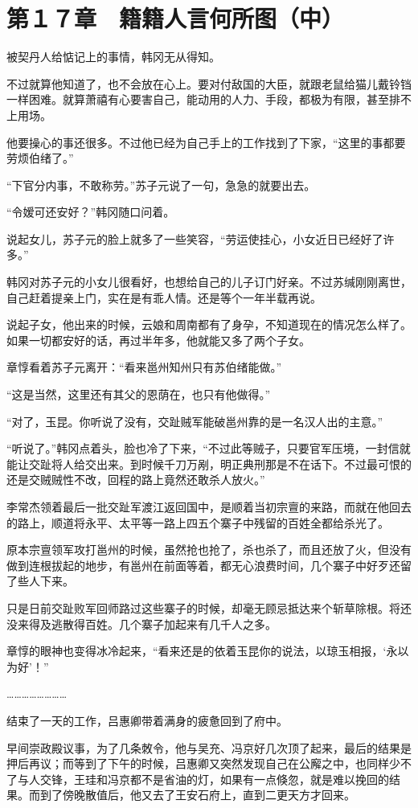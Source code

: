 \section{第１７章　籍籍人言何所图（中）}

被契丹人给惦记上的事情，韩冈无从得知。

不过就算他知道了，也不会放在心上。要对付敌国的大臣，就跟老鼠给猫儿戴铃铛一样困难。就算萧禧有心要害自己，能动用的人力、手段，都极为有限，甚至排不上用场。

他要操心的事还很多。不过他已经为自己手上的工作找到了下家，“这里的事都要劳烦伯绪了。”

“下官分内事，不敢称劳。”苏子元说了一句，急急的就要出去。

“令嫒可还安好？”韩冈随口问着。

说起女儿，苏子元的脸上就多了一些笑容，“劳运使挂心，小女近日已经好了许多。”

韩冈对苏子元的小女儿很看好，也想给自己的儿子订门好亲。不过苏缄刚刚离世，自己赶着提亲上门，实在是有乖人情。还是等个一年半载再说。

说起子女，他出来的时候，云娘和周南都有了身孕，不知道现在的情况怎么样了。如果一切都安好的话，再过半年多，他就能又多了两个子女。

章惇看着苏子元离开：“看来邕州知州只有苏伯绪能做。”

“这是当然，这里还有其父的恩荫在，也只有他做得。”

“对了，玉昆。你听说了没有，交趾贼军能破邕州靠的是一名汉人出的主意。”

“听说了。”韩冈点着头，脸也冷了下来，“不过此等贼子，只要官军压境，一封信就能让交趾将人给交出来。到时候千刀万剐，明正典刑那是不在话下。不过最可恨的还是交贼贼性不改，回程的路上竟然还敢杀人放火。”

李常杰领着最后一批交趾军渡江返回国中，是顺着当初宗亶的来路，而就在他回去的路上，顺道将永平、太平等一路上四五个寨子中残留的百姓全都给杀光了。

原本宗亶领军攻打邕州的时候，虽然抢也抢了，杀也杀了，而且还放了火，但没有做到连根拔起的地步，有邕州在前面等着，都无心浪费时间，几个寨子中好歹还留了些人下来。

只是日前交趾败军回师路过这些寨子的时候，却毫无顾忌抵达来个斩草除根。将还没来得及逃散得百姓。几个寨子加起来有几千人之多。

章惇的眼神也变得冰冷起来，“看来还是的依着玉昆你的说法，以琼玉相报，‘永以为好’！”

……………………

结束了一天的工作，吕惠卿带着满身的疲惫回到了府中。

早间崇政殿议事，为了几条敇令，他与吴充、冯京好几次顶了起来，最后的结果是押后再议；而等到了下午的时候，吕惠卿又突然发现自己在公廨之中，也同样少不了与人交锋，王珪和冯京都不是省油的灯，如果有一点倏忽，就是难以挽回的结果。而到了傍晚散值后，他又去了王安石府上，直到二更天方才回来。

